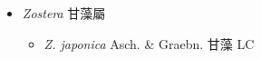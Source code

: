 
  \begin{itemize}
 \item[] \textit{Zostera} 甘藻屬
                                
  \begin{itemize}
        \item[] \textit{Z. japonica} Asch. \& Graebn.  甘藻   LC
  \end{itemize}
  \end{itemize}
